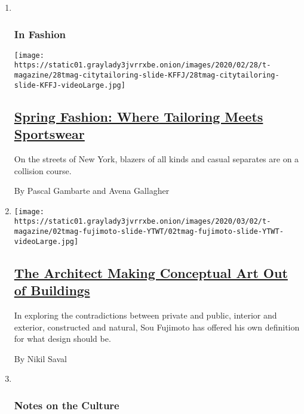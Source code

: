 \begin{enumerate}
\def\labelenumi{\arabic{enumi}.}
\item ~
  \hypertarget{in-fashion}{%
  \subsubsection{In Fashion}\label{in-fashion}}

  \texttt{[image: https://static01.graylady3jvrrxbe.onion/images/2020/02/28/t-magazine/28tmag-citytailoring-slide-KFFJ/28tmag-citytailoring-slide-KFFJ-videoLarge.jpg]}

  \hypertarget{spring-fashion-where-tailoring-meets-sportswear}{%
  \subsection{\texorpdfstring{\href{/2020/02/28/t-magazine/spring-mens-fashion-tailoring.html}{Spring
  Fashion: Where Tailoring Meets
  Sportswear}}{Spring Fashion: Where Tailoring Meets Sportswear}}\label{spring-fashion-where-tailoring-meets-sportswear}}

  On the streets of New York, blazers of all kinds and casual separates
  are on a collision course.

  By Pascal Gambarte and Avena Gallagher
\item
  \texttt{[image: https://static01.graylady3jvrrxbe.onion/images/2020/03/02/t-magazine/02tmag-fujimoto-slide-YTWT/02tmag-fujimoto-slide-YTWT-videoLarge.jpg]}

  \hypertarget{the-architect-making-conceptual-art-out-of-buildings}{%
  \subsection{\texorpdfstring{\href{/2020/03/02/t-magazine/sou-fujimoto.html}{The
  Architect Making Conceptual Art Out of
  Buildings}}{The Architect Making Conceptual Art Out of Buildings}}\label{the-architect-making-conceptual-art-out-of-buildings}}

  In exploring the contradictions between private and public, interior
  and exterior, constructed and natural, Sou Fujimoto has offered his
  own definition for what design should be.

  By Nikil Saval
\item ~
  \hypertarget{notes-on-the-culture}{%
  \subsubsection{Notes on the Culture}\label{notes-on-the-culture}}


\end{enumerate}

